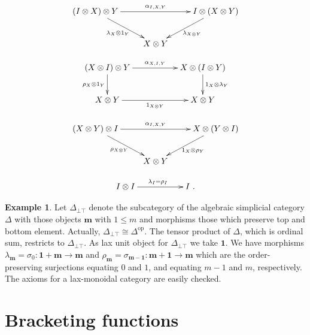 \documentclass[a4paper,12pt,reqno]{amsart}
\theoremstyle{definition}
\newtheorem{example}[theorem]{Example}
\theoremstyle{fact}
\theoremstyle{genquest}
\theoremstyle{step}
\newcommand{\lra}{\longrightarrow}
\def\ordm{{\mathbf{m}}}
\begin{document}
\begin{equation}\label{leftunit}
\xymatrix{
(I\otimes X)\otimes Y \ar[rd]_{\lambda_{X} \otimes 1_Y}\ar[rr]^{\alpha_{I,X,Y}}   && I\otimes (X\otimes Y) \ar[ld]^{\lambda_{X\otimes Y}} \\
& X\otimes Y  &
}
\end{equation}

\begin{equation}\label{midunit}
\xymatrix{
(X\otimes I)\otimes Y \ar[d]_-{\rho_X \otimes 1_Y} \ar[rr]^-{\alpha_{X,I,Y}} && X\otimes (I\otimes Y) \ar[d]^-{1_X\otimes \lambda_Y} \\
X\otimes Y  \ar[rr]_-{1_{X\otimes Y}} && X\otimes Y}
\end{equation}

\begin{equation}\label{rightunit}
\xymatrix{
(X\otimes Y) \ar[rd]_{\rho_{X \otimes Y}}\otimes I \ar[rr]^{\alpha_{I,X,Y}}   && X\otimes (Y\otimes I)  \ar[ld]^{1_X\otimes \rho_Y}  \\
& X\otimes Y &
}
\end{equation}

\begin{equation}\label{unitunit}
\xymatrix{
I\otimes I \ar[rr]^{\lambda_I = \rho_I}   & & I \ .
}
\end{equation}

\begin{example}\label{Dbt}
Let $\Delta_{\bot \top}$ denote the subcategory of the algebraic simplicial category 
$\Delta$ with those objects 
$\ordm$ with $1\le m$ and morphisms those which preserve top and bottom element.  
Actually, $\Delta_{\bot \top}\cong \Delta^{\mathrm{op}}$. 
The tensor product of $\Delta$, which is ordinal sum, restricts to $\Delta_{\bot \top}$.
As lax unit object for $\Delta_{\bot \top}$ we take $\mathbf{1}$.
We have morphisms 
$\lambda_{\mathbf{m}} = \sigma_0 : \mathbf{1+m} \lra \mathbf{m}$ and $\rho_{\mathbf{m}} = \sigma_{\mathbf{m-1}} : \mathbf{m +1} \lra \mathbf{m}$
which are the order-preserving surjections equating $0$ and $1$, and equating 
$m-1$ and $m$, respectively.
The axioms for a lax-monoidal category are easily checked.   
\end{example}

\section{Bracketing functions}\label{Bf}
\end{document}
